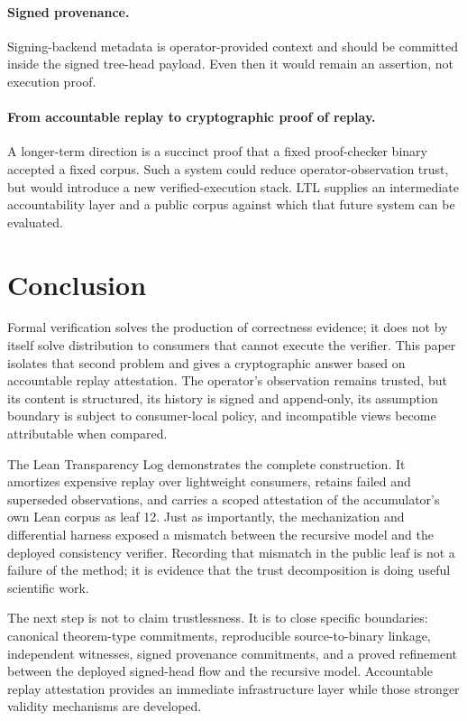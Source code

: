\documentclass[11pt]{article}
\theoremstyle{remark}
\begin{document}
\paragraph{Signed provenance.}
Signing-backend metadata is operator-provided context and should be committed
inside the signed tree-head payload. Even then it would remain an assertion,
not execution proof.

\paragraph{From accountable replay to cryptographic proof of replay.}
A longer-term direction is a succinct proof that a fixed proof-checker binary
accepted a fixed corpus. Such a system could reduce operator-observation trust,
but would introduce a new verified-execution stack. LTL supplies an
intermediate accountability layer and a public corpus against which that future
system can be evaluated.

\section{Conclusion}

Formal verification solves the production of correctness evidence; it does not
by itself solve distribution to consumers that cannot execute the verifier.
This paper isolates that second problem and gives a cryptographic answer based
on accountable replay attestation. The operator's observation remains trusted,
but its content is structured, its history is signed and append-only, its
assumption boundary is subject to consumer-local policy, and incompatible views
become attributable when compared.

The Lean Transparency Log demonstrates the complete construction. It amortizes
expensive replay over lightweight consumers, retains failed and superseded
observations, and carries a scoped attestation of the accumulator's own Lean
corpus as leaf 12. Just as importantly, the mechanization and differential
harness exposed a mismatch between the recursive model and the deployed
consistency verifier. Recording that mismatch in the public leaf is not a
failure of the method; it is evidence that the trust decomposition is doing
useful scientific work.

The next step is not to claim trustlessness. It is to close specific boundaries:
canonical theorem-type commitments, reproducible source-to-binary linkage,
independent witnesses, signed provenance commitments, and a proved refinement
between the deployed signed-head flow and the recursive model. Accountable
replay attestation provides an immediate infrastructure layer while those
stronger validity mechanisms are developed.
\end{document}
